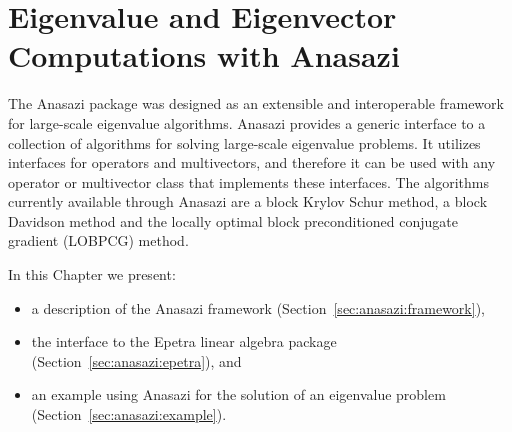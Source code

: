% 
% 
% 
%   
%   
% 
% 

\section{Eigenvalue and Eigenvector Computations with Anasazi}
\label{chap:anasazi}

The Anasazi package was designed as an extensible and interoperable framework
for large-scale eigenvalue algorithms. Anasazi provides a generic interface to a
collection of algorithms for solving large-scale eigenvalue problems. It
utilizes interfaces for operators and multivectors, and therefore it can be used
with any operator or multivector class that implements these interfaces. The
algorithms currently available through Anasazi are a block Krylov Schur method,
a block Davidson method and the locally optimal block preconditioned conjugate
gradient (LOBPCG) method.

In this Chapter we present:
\begin{itemize}
\item a description of the Anasazi framework (Section~\ref{sec:anasazi:framework}),
\item the interface to the Epetra linear algebra package
(Section~\ref{sec:anasazi:epetra}), and
\item an example using Anasazi for the solution of an eigenvalue problem 
(Section~\ref{sec:anasazi:example}).
\end{itemize}



